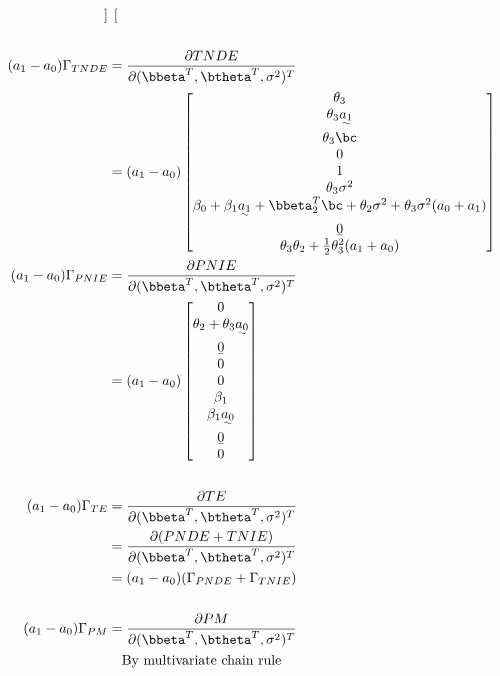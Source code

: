 \documentclass[10pt]{article}
\begin{document}
\begin{align*}
\begin{bmatrix}
    \end{bmatrix}\\
  \\
  (a_{1}-a_{0})\Gamma_{TNDE}
  &= \frac{\partial TNDE}{\partial (\bbeta^{T},\btheta^{T},\sigma^2)^{T}}\\
  &= (a_{1}-a_{0})
    \begin{bmatrix}
      \theta_{3}\\
      \theta_{3}\uwave{a_{1}}\\
      \theta_{3}\bc\\
      0\\
      1\\
      \theta_{3}\sigma^{2}\\
      \beta_{0} + \beta_{1}\uwave{a_{1}} + \bbeta_{2}^{T}\bc + \theta_{2}\sigma^{2} + \theta_{3}\sigma^{2}(a_{0} + a_{1})\\
      \b0\\
      \theta_{3}\theta_{2} + \frac{1}{2}\theta_{3}^{2}(a_{1} + a_{0})\\
    \end{bmatrix}\\
  (a_{1}-a_{0})\Gamma_{PNIE}
  &= \frac{\partial PNIE}{\partial (\bbeta^{T},\btheta^{T},\sigma^2)^{T}}\\
  &= (a_{1}-a_{0})
    \begin{bmatrix}
      0\\
      \theta_{2} + \theta_{3}\uwave{a_{0}}\\
      \b0\\
      0\\
      0\\
      \beta_{1}\\
      \beta_{1}\uwave{a_{0}}\\
      \b0\\
      0\\
    \end{bmatrix}\\
  \\
  (a_{1}-a_{0})\Gamma_{TE}
  &= \frac{\partial TE}{\partial (\bbeta^{T},\btheta^{T},\sigma^2)^{T}}\\
  &= \frac{\partial (PNDE+TNIE)}{\partial (\bbeta^{T},\btheta^{T},\sigma^2)^{T}}\\
  &= (a_{1}-a_{0})(\Gamma_{PNDE} + \Gamma_{TNIE})\\
  \\
  (a_{1}-a_{0})\Gamma_{PM}
  &= \frac{\partial PM}{\partial (\bbeta^{T},\btheta^{T},\sigma^2)^{T}}\\
  &~~~\text{By multivariate chain rule}\\

\end{align*}
\end{document}
